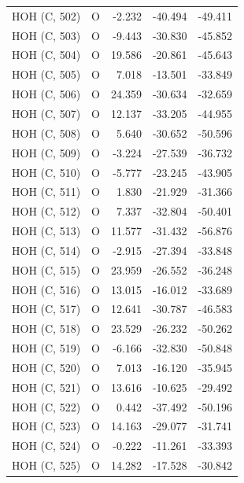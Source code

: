 \begin{longtable}{@{}lcrr@{}}
  \cmidrule(r){1-5}
  HOH (C, 502) & O & -2.232 & -40.494 & -49.411 \\
  \cmidrule(r){1-5}
  HOH (C, 503) & O & -9.443 & -30.830 & -45.852 \\
  \cmidrule(r){1-5}
  HOH (C, 504) & O & 19.586 & -20.861 & -45.643 \\
  \cmidrule(r){1-5}
  HOH (C, 505) & O & 7.018 & -13.501 & -33.849 \\
  \cmidrule(r){1-5}
  HOH (C, 506) & O & 24.359 & -30.634 & -32.659 \\
  \cmidrule(r){1-5}
  HOH (C, 507) & O & 12.137 & -33.205 & -44.955 \\
  \cmidrule(r){1-5}
  HOH (C, 508) & O & 5.640 & -30.652 & -50.596 \\
  \cmidrule(r){1-5}
  HOH (C, 509) & O & -3.224 & -27.539 & -36.732 \\
  \cmidrule(r){1-5}
  HOH (C, 510) & O & -5.777 & -23.245 & -43.905 \\
  \cmidrule(r){1-5}
  HOH (C, 511) & O & 1.830 & -21.929 & -31.366 \\
  \cmidrule(r){1-5}
  HOH (C, 512) & O & 7.337 & -32.804 & -50.401 \\
  \cmidrule(r){1-5}
  HOH (C, 513) & O & 11.577 & -31.432 & -56.876 \\
  \cmidrule(r){1-5}
  HOH (C, 514) & O & -2.915 & -27.394 & -33.848 \\
  \cmidrule(r){1-5}
  HOH (C, 515) & O & 23.959 & -26.552 & -36.248 \\
  \cmidrule(r){1-5}
  HOH (C, 516) & O & 13.015 & -16.012 & -33.689 \\
  \cmidrule(r){1-5}
  HOH (C, 517) & O & 12.641 & -30.787 & -46.583 \\
  \cmidrule(r){1-5}
  HOH (C, 518) & O & 23.529 & -26.232 & -50.262 \\
  \cmidrule(r){1-5}
  HOH (C, 519) & O & -6.166 & -32.830 & -50.848 \\
  \cmidrule(r){1-5}
  HOH (C, 520) & O & 7.013 & -16.120 & -35.945 \\
  \cmidrule(r){1-5}
  HOH (C, 521) & O & 13.616 & -10.625 & -29.492 \\
  \cmidrule(r){1-5}
  HOH (C, 522) & O & 0.442 & -37.492 & -50.196 \\
  \cmidrule(r){1-5}
  HOH (C, 523) & O & 14.163 & -29.077 & -31.741 \\
  \cmidrule(r){1-5}
  HOH (C, 524) & O & -0.222 & -11.261 & -33.393 \\
  \cmidrule(r){1-5}
  HOH (C, 525) & O & 14.282 & -17.528 & -30.842 \\

\end{longtable}

